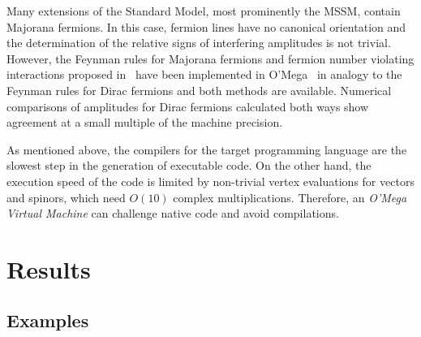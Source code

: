 \documentclass[12pt,a4paper]{article}
\begin{document}
Many extensions of the Standard Model, most prominently the MSSM,
contain Majorana fermions.  In
this case, fermion lines have no canonical orientation and the
determination of the relative signs of interfering amplitudes is not
trivial.  However, the Feynman rules for Majorana fermions and fermion
number violating interactions proposed in~\cite{Denner/etal:Majorana}
have been implemented in O'Mega~\cite{OMEGA2} in analogy to the Feynman rules
for Dirac fermions and both methods are available.  Numerical
comparisons of amplitudes for Dirac fermions calculated both ways show
agreement at a small multiple of the machine precision.

As mentioned above, the compilers for the target programming language
are the slowest step in the generation of executable code.  On the
other hand, the execution speed of the code is limited by non-trivial
vertex evaluations for vectors and spinors, which need $O(10)$ complex
multiplications.  Therefore, an \emph{O'Mega Virtual Machine} can
challenge native code and avoid compilations.

\section{Results}
\label{sec:results}

\subsection{Examples}
\label{sec:examples}
\end{document}
